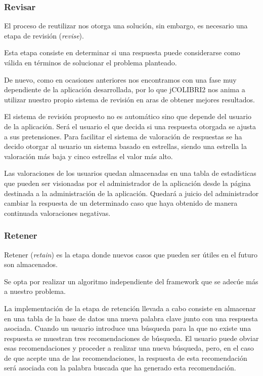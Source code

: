 \subsubsection{Revisar}\label{Revisar}

El proceso de reutilizar nos otorga una solución, sin embargo, es necesario una etapa de revisión (\emph{revise}).

Esta etapa consiste en determinar si una respuesta puede considerarse como válida en términos de solucionar el problema planteado.

De nuevo, como en ocasiones anteriores nos encontramos con una fase muy dependiente de la aplicación desarrollada, por lo que jCOLIBRI2 nos anima a utilizar nuestro propio sistema de revisión en aras de obtener mejores resultados.

El sistema de revisión propuesto no es automático sino que depende del usuario de la aplicación. Será el usuario el que decida si una respuesta otorgada se ajusta a sus pretensiones. Para facilitar el sistema de valoración de respuestas se ha decido otorgar al usuario un sistema basado en estrellas, siendo una estrella la valoración más baja y cinco estrellas el valor más alto.

Las valoraciones de los usuarios quedan almacenadas en una tabla de estadísticas que pueden ser visionadas por el administrador de la aplicación desde la página destinada a la administración de la aplicación. Quedará a juicio del administrador cambiar la respuesta de un determinado caso que haya obtenido de manera continuada valoraciones negativas.

\subsubsection{Retener}\label{retener}

Retener (\emph{retain}) es la etapa donde nuevos casos que pueden ser útiles en el futuro son almacenados.

Se opta por realizar un algoritmo independiente del framework que se adecúe más a nuestro problema.

La implementación de la etapa de retención llevada a cabo consiste en almacenar en una tabla de la base de datos una nueva palabra clave junto con una respuesta asociada. Cuando un usuario introduce una búsqueda para la que no existe una respuesta se muestran tres recomendaciones de búsqueda. El usuario puede obviar esas recomendaciones y proceder a realizar una nueva búsqueda, pero, en el caso de que acepte una de las recomendaciones, la respuesta de esta recomendación será asociada con la palabra buscada que ha generado esta recomendación.

